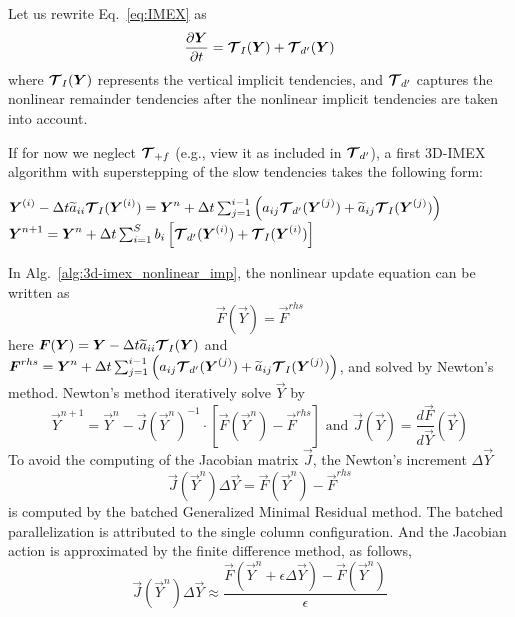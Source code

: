 \documentclass{report}
\numberwithin{equation}{section}
\begin{document}
Let us rewrite Eq.~\eqref{eq:IMEX} as
\begin{equation}
\label{eq:IMEX_v3}
\frac{\partial\boldsymbol{{Y}}}{\partial t} =  \boldsymbol{{\mathcal{T}}}_I(\boldsymbol{{Y}}) + \boldsymbol{{\mathcal{T}}}_{d'}(\boldsymbol{{Y}})
\end{equation}
where $\boldsymbol{{\mathcal{T}}}_I(\boldsymbol{{Y}})$ represents the vertical implicit tendencies, and $\boldsymbol{{\mathcal{T}}}_{d'}$ captures the nonlinear remainder tendencies after the nonlinear implicit tendencies are taken into account.  

If for now we neglect $\boldsymbol{{\mathcal{T}}}_{+f}$ (e.g., view it as included in  $\boldsymbol{{\mathcal{T}}}_{d'}$), a first 3D-IMEX algorithm with superstepping of the slow tendencies takes the following form:
\begin{algorithm}
\label{alg:3d-imex_nonlinear_imp}
\begin{algorithmic}
\State
{}
\State $ \boldsymbol{{Y}}^{(i)} - \Delta t \widetilde{a}_{ii} \boldsymbol{{\mathcal{T}}}_I(\boldsymbol{{Y}}^{(i)})=\boldsymbol{{Y}}^{n} + \Delta t \sum_{j=1}^{i-1} \left( a_{ij} \boldsymbol{{\mathcal{T}}}_{d'}(\boldsymbol{{Y}}^{(j)}) 
+ \widetilde{a}_{ij} \boldsymbol{{\mathcal{T}}}_I( \boldsymbol{{Y}}^{(j)} )\right)$ 
\EndFor %
\State $\boldsymbol{{Y}}^{n+1}=\boldsymbol{{Y}}^{n} + \Delta t \sum_{i=1}^{S} b_{i} \left[ \boldsymbol{{\mathcal{T}}}_{d'}(\boldsymbol{{Y}}^{(i)}) 
+ \boldsymbol{{\mathcal{T}}}_I(\boldsymbol{{Y}}^{(i)}) \right]$
\EndFunction
\end{algorithmic}
\end{algorithm}

In Alg.\ \ref{alg:3d-imex_nonlinear_imp}, the nonlinear update equation can be written as 
\begin{equation}
\label{eq:newton-v1}
\vec{F}(\vec{Y}) = \vec{F}^{rhs}
\end{equation}
here $\boldsymbol{{F}}(\boldsymbol{{Y}})= \boldsymbol{{Y}} - \Delta t \widetilde{a}_{ii} \boldsymbol{{\mathcal{T}}}_I(\boldsymbol{{Y}})$  and $\boldsymbol{{F}}^{rhs} = \boldsymbol{{Y}}^{n} + \Delta t \sum_{j=1}^{i-1} \left( a_{ij} \boldsymbol{{\mathcal{T}}}_{d'}(\boldsymbol{{Y}}^{(j)}) 
+ \widetilde{a}_{ij} \boldsymbol{{\mathcal{T}}}_I( \boldsymbol{{Y}}^{(j)} )\right)$, and solved by Newton's method. Newton's method iteratively solve $\vec{Y}$ by 
\begin{equation}
    \vec{Y}^{n+1} = \vec{Y}^{n} - \vec{J}(\vec{Y}^{n})^{-1}\cdot [\vec{F}(\vec{Y}^n) - \vec{F}^{rhs}]\textrm{ and }  \vec{J}(\vec{Y}) = \frac{d\vec{F}}{d\vec{Y}}(\vec{Y})
\end{equation}
%
To avoid the computing of the Jacobian matrix $\vec{J}$, the Newton's increment $\Delta\vec{Y}$
\begin{equation} 
\vec{J}(\vec{Y}^{n})\Delta\vec{Y} = \vec{F}(\vec{Y}^n) -\vec{F}^{rhs}
\end{equation}
 is computed by the batched Generalized Minimal Residual method. The batched parallelization is attributed to the single column configuration. And the Jacobian action is approximated by the finite difference method, as follows,  
 \begin{equation}
     \vec{J}(\vec{Y}^{n})\Delta \vec{Y} \approx \frac{\vec{F}(\vec{Y}^n + \epsilon \Delta \vec{Y}) - \vec{F}(\vec{Y}^n)}{\epsilon}
 \end{equation}
 
\end{document}
